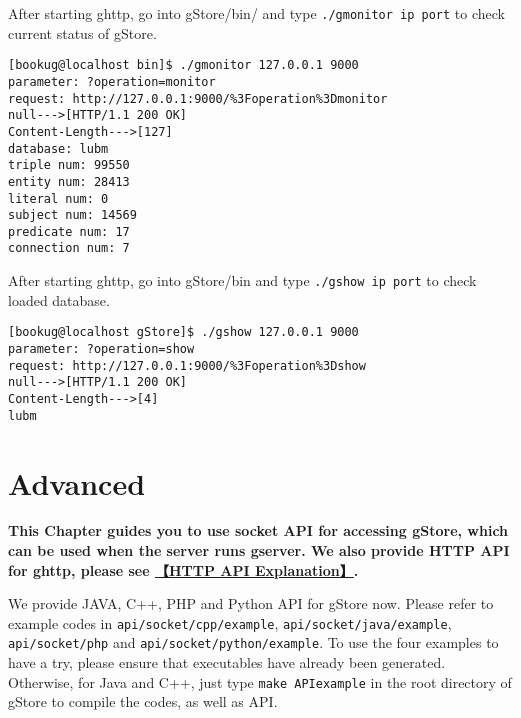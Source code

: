\documentclass[titlepage, a4paper, 12pt]{article}
\begin{document}
After starting ghttp, go into gStore/bin/ and type \texttt{./gmonitor ip port} to check current status of gStore.

\begin{verbatim}
[bookug@localhost bin]$ ./gmonitor 127.0.0.1 9000
parameter: ?operation=monitor
request: http://127.0.0.1:9000/%3Foperation%3Dmonitor
null--->[HTTP/1.1 200 OK]
Content-Length--->[127]
database: lubm
triple num: 99550
entity num: 28413
literal num: 0
subject num: 14569
predicate num: 17
connection num: 7
\end{verbatim}


After starting ghttp, go into gStore/bin and type \texttt{./gshow ip port} to check loaded database.

\begin{verbatim}
[bookug@localhost gStore]$ ./gshow 127.0.0.1 9000
parameter: ?operation=show
request: http://127.0.0.1:9000/%3Foperation%3Dshow
null--->[HTTP/1.1 200 OK]
Content-Length--->[4]
lubm
\end{verbatim}

\clearpage

\part{Advanced}


\textbf{This Chapter guides you to use socket API for accessing gStore, which can be used when the server runs gserver. We also provide HTTP API for ghttp, please see \hyperref[chapter06]{【HTTP API Explanation】}.}


We provide JAVA, C++, PHP and Python API for gStore now. Please refer to example
codes in \texttt{api/socket/cpp/example}, \texttt{api/socket/java/example}, \texttt{api/socket/php} and \texttt{api/socket/python/example}. To use the four examples to have a try, please ensure that executables have already been generated. Otherwise, for Java and C++, just type \texttt{make\ APIexample} in the root directory of gStore to compile the codes, as well as API.
\end{document}
